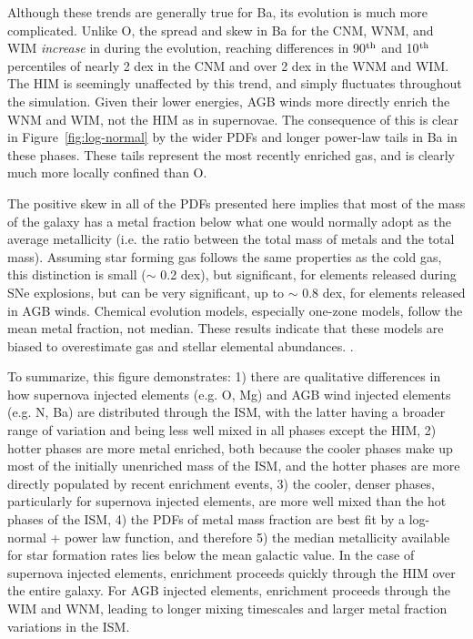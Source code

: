 \documentclass[twocolumn]{aastex61}
\begin{document}

Although these trends are generally true for Ba, its evolution is much more complicated.
Unlike O, the spread and skew in Ba for the CNM, WNM, and WIM \textit{increase} in during the evolution, reaching differences in 90$^{\rm th}$ and 10$^{\rm th}$ percentiles of nearly 2 dex in the CNM and over 2 dex in the WNM and WIM. The HIM is seemingly unaffected by this trend, and simply fluctuates throughout the simulation. Given their lower energies, AGB winds more directly enrich the WNM and WIM, not the HIM as in supernovae. The consequence of this is clear in Figure~\ref{fig:log-normal} by the wider PDFs and longer power-law tails in Ba in these phases. These tails represent the most recently enriched gas, and is clearly much more locally confined than O. 

The positive skew in all of the PDFs presented here implies that most of the mass of the galaxy has a metal fraction below what one would normally adopt as the average metallicity (i.e. the ratio between the total mass of metals and the total mass). Assuming star forming gas follows the same properties as the cold gas, this distinction is small ($\sim$ 0.2 dex), but significant, for elements released during SNe explosions, but can be very significant, up to $\sim$ 0.8 dex, for elements released in AGB winds. Chemical evolution models, especially one-zone models, follow the mean metal fraction, not median. These results indicate that these models are biased to overestimate gas and stellar elemental abundances.
. %

To summarize, this figure demonstrates: 1) there are qualitative differences in how supernova injected elements (e.g. O, Mg) and AGB wind injected elements (e.g. N, Ba) are distributed through the ISM, with the latter having a broader range of variation and being less well mixed in all phases except the HIM, 2) hotter phases are more metal enriched, both because the cooler phases make up most of the initially unenriched mass of the ISM, and the hotter phases are more directly populated by recent enrichment events, 3) the cooler, denser phases, particularly for supernova injected elements, are more well mixed than the hot phases of the ISM, 4) the PDFs of metal mass fraction are best fit by a log-normal + power law function, and therefore 5) the median metallicity available for star formation rates lies below the mean galactic value. In the case of supernova injected elements, enrichment proceeds quickly through the HIM over the entire galaxy. For AGB injected elements, enrichment proceeds through the WIM and WNM, leading to longer mixing timescales and larger metal fraction variations in the ISM. 
\end{document}
